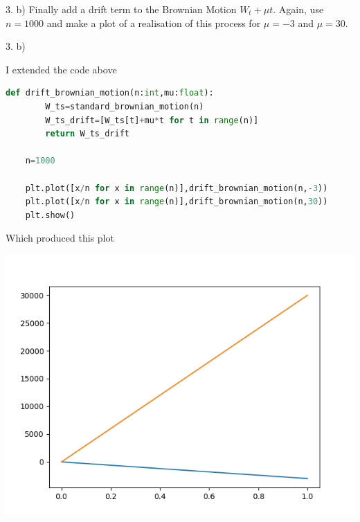 \documentclass[11pt,a4paper]{article}
\begin{document}
\begin{question}{3. b)}
  Finally add a drift term to the Brownian Motion $W_t+\mu t$. Again, use $n=1000$ and make a plot of a realisation of this process for $\mu=-3$ and $\mu=30$.
\end{question}

\begin{answer}{3. b)}
\end{answer}
  I extended the code above
  \begin{lstlisting}[language=Python]
    def drift_brownian_motion(n:int,mu:float):
        W_ts=standard_brownian_motion(n)
        W_ts_drift=[W_ts[t]+mu*t for t in range(n)]
        return W_ts_drift

    n=1000

    plt.plot([x/n for x in range(n)],drift_brownian_motion(n,-3))
    plt.plot([x/n for x in range(n)],drift_brownian_motion(n,30))
    plt.show()
  \end{lstlisting}
  Which produced this plot
  \begin{center}
    \includegraphics[width=.7\textwidth]{img/3_b.png}
  \end{center}
\end{document}
